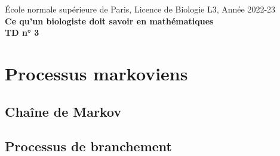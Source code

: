\documentclass[french, 12pt]{article}
\numberwithin{exercise}{section}
\numberwithin{equation}{section}
\begin{document}

\begin{center}
  \small{\sc \'Ecole normale supérieure de Paris, Licence de Biologie L3, Année 2022-23} \\
  \bigskip
  \large{\bf Ce qu'un biologiste doit savoir en mathématiques} \\
  \bigskip  
  {\bf TD n° 3}
\end{center}

\section{Processus markoviens} 
\newcommand{\probas}{/home/robin/ENSEIGN/Cours/MathBiologie/L3-ENS-Math1/Exercices/Probas}

\subsection{Chaîne de Markov}



\subsection{Processus de branchement}




\end{document}
